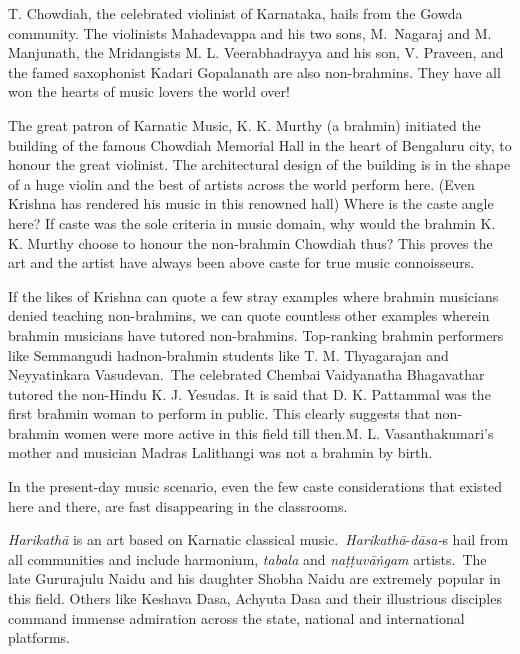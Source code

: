 T. Chowdiah, the celebrated violinist of Karnataka, hails from the Gowda community. The violinists Mahadevappa and his two sons, M.~Nagaraj and M. Manjunath, the Mridangists M. L. Veerabhadrayya and his son, V. Praveen, and the famed saxophonist Kadari Gopalanath are also non-brahmins. They have all won the hearts of music lovers the world over!

The great patron of Karnatic Music, K. K. Murthy (a brahmin) initiated the building of the famous Chowdiah Memorial Hall in the heart of Bengaluru city, to honour the great violinist. The architectural design of the building is in the shape of a huge violin and the best of artists across the world perform here. (Even Krishna has rendered his music in this renowned hall) Where is the caste angle here? If caste was the sole criteria in music domain, why would the brahmin K. K. Murthy choose to honour the non-brahmin Chowdiah thus? This proves the art and the artist have always been above caste for true music connoisseurs.

If the likes of Krishna can quote a few stray examples where brahmin musicians denied teaching non-brahmins, we can quote countless other examples wherein brahmin musicians have tutored non-brahmins. Top-ranking brahmin performers like Semmangudi had\break non-brahmin students like T. M. Thyagarajan and Neyyatinkara Vasudevan.~The celebrated Chembai Vaidyanatha Bhagavathar tutored the non-Hindu K. J. Yesudas. It is said that D. K. Pattammal was the first brahmin woman to perform in public. This clearly suggests that non-brahmin women were more active in this field till then.\break M. L. Vasanthakumari’s mother and musician Madras Lalithangi was not a brahmin by birth.

In the present-day music scenario, even the few caste considerations that existed here and there, are fast disappearing in the classrooms.

\textit{Harikathā} is an art based on Karnatic classical music.~\textit{Harikathā}-\break \textit{dāsa-}s hail from all communities and include harmonium, \textit{tabala} and \textit{naṭṭuvāṅgam} artists.~The late Gururajulu Naidu and his daughter Shobha Naidu are extremely popular in this field. Others like Keshava Dasa, Achyuta Dasa and their illustrious disciples command immense admiration across the state, national and international platforms.

